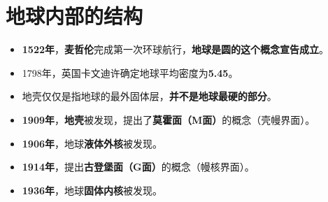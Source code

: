\documentclass[twoside,titlepage,hyperref,UTF8,12pt]{ctexart}
\begin{document}
\section{地球内部的结构}
\begin{itemize}
    \item \textbf{1522年}，\textbf{麦哲伦}完成第一次环球航行，\textbf{地球是圆的这个概念宣告成立}。
    \item 1798年，英国卡文迪许确定地球平均密度为\textbf{5.45}。
    \item 地壳仅仅是指地球的最外固体层，\textbf{并不是地球最硬的部分}。
    \item \textbf{1909年}，\textbf{地壳}被发现，提出了\textbf{莫霍面（M面）}的概念（壳幔界面）。
    \item \textbf{1906年}，地球\textbf{液体外核}被发现。
    \item \textbf{1914年}，提出\textbf{古登堡面（G面）}的概念（幔核界面）。
    \item \textbf{1936年}，地球\textbf{固体内核}被发现。
\end{itemize}
\end{document}
